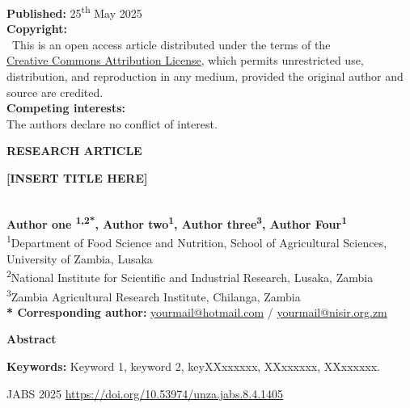 \documentclass[11pt]{extarticle}
\begin{document}
\begin{minipage}{\textwidth}
\begin{minipage}[t]{0.35\textwidth}
\begin{leftinfobox}
      \textbf{Published:} 25\textsuperscript{th} May 2025 \\[0.5em]

      \textbf{Copyright:} \\
      {\small\faCopyright}~This is an open access article distributed under the terms of the \\
      \href{https://creativecommons.org/licenses/by/4.0/}{Creative Commons Attribution License}, which permits unrestricted use, distribution, and reproduction in any medium, provided the original author and source are credited. \\[0.5em]

      \textbf{Competing interests:} \\
      The authors declare no conflict of interest.
    \end{leftinfobox}
  \end{minipage}%
  \hfill
  \begin{minipage}[t]{0.62\textwidth}
    \vspace{0pt}
    \textbf{RESEARCH ARTICLE} \\[0.6em]

    {\Large\bfseries
      [INSERT TITLE HERE]   

    } \\[1em]

    \small
    \textbf{Author one \textsuperscript{1,2*}, Author two\textsuperscript{1}, Author three\textsuperscript{3}, Author Four\textsuperscript{1}} \\[0.5em]

    \textsuperscript{1}Department of Food Science and Nutrition, School of Agricultural Sciences, University of Zambia, Lusaka \\
    \textsuperscript{2}National Institute for Scientific and Industrial Research, Lusaka, Zambia \\
    \textsuperscript{3}Zambia Agricultural Research Institute, Chilanga, Zambia \\[0.5em]

    \textbf{* Corresponding author:} \href{mailto:yourmail@hotmail.com}{yourmail@hotmail.com} / \href{mailto:yourmail@nisir.org.zm}{yourmail@nisir.org.zm}

    \vspace{1.2em}
    \normalsize
    \textbf{Abstract} \\[0.25em]
    \justifying
    \sloppy
    \lipsum [1-2]

    \vspace{1em}
    \textbf{Keywords:} Keyword 1, keyword 2, keyXXxxxxxx, XXxxxxxx, XXxxxxxx.
  \end{minipage}

  \vspace{3em}

  \begin{center}
    \small
    JABS 2025 \textbar{} \href{https://doi.org/10.53974/unza.jabs.8.4.1405}{https://doi.org/10.53974/unza.jabs.8.4.1405}
  \end{center}
\end{minipage}
\end{document}

